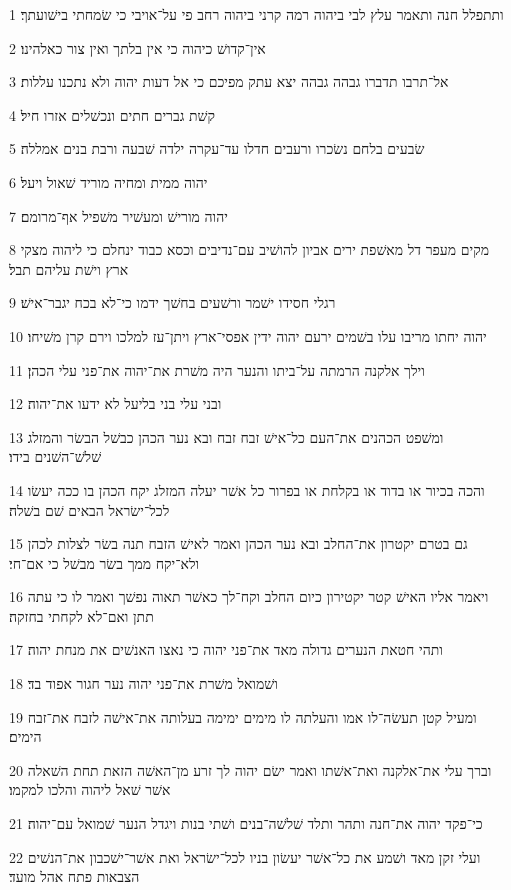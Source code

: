 \par 1 ותתפלל חנה ותאמר עלץ לבי ביהוה רמה קרני ביהוה רחב פי על־אויבי כי שׂמחתי בישׁועתך׃
\par 2 אין־קדושׁ כיהוה כי אין בלתך ואין צור כאלהינו׃
\par 3 אל־תרבו תדברו גבהה גבהה יצא עתק מפיכם כי אל דעות יהוה ולא נתכנו עללות׃
\par 4 קשׁת גברים חתים ונכשׁלים אזרו חיל׃
\par 5 שׂבעים בלחם נשׂכרו ורעבים חדלו עד־עקרה ילדה שׁבעה ורבת בנים אמללה׃
\par 6 יהוה ממית ומחיה מוריד שׁאול ויעל׃
\par 7 יהוה מורישׁ ומעשׁיר משׁפיל אף־מרומם׃
\par 8 מקים מעפר דל מאשׁפת ירים אביון להושׁיב עם־נדיבים וכסא כבוד ינחלם כי ליהוה מצקי ארץ וישׁת עליהם תבל׃
\par 9 רגלי חסידו ישׁמר ורשׁעים בחשׁך ידמו כי־לא בכח יגבר־אישׁ׃
\par 10 יהוה יחתו מריבו עלו בשׁמים ירעם יהוה ידין אפסי־ארץ ויתן־עז למלכו וירם קרן משׁיחו׃
\par 11 וילך אלקנה הרמתה על־ביתו והנער היה משׁרת את־יהוה את־פני עלי הכהן׃
\par 12 ובני עלי בני בליעל לא ידעו את־יהוה׃
\par 13 ומשׁפט הכהנים את־העם כל־אישׁ זבח זבח ובא נער הכהן כבשׁל הבשׂר והמזלג שׁלשׁ־השׁנים בידו׃
\par 14 והכה בכיור או בדוד או בקלחת או בפרור כל אשׁר יעלה המזלג יקח הכהן בו ככה יעשׂו לכל־ישׂראל הבאים שׁם בשׁלה׃
\par 15 גם בטרם יקטרון את־החלב ובא נער הכהן ואמר לאישׁ הזבח תנה בשׂר לצלות לכהן ולא־יקח ממך בשׂר מבשׁל כי אם־חי׃
\par 16 ויאמר אליו האישׁ קטר יקטירון כיום החלב וקח־לך כאשׁר תאוה נפשׁך ואמר לו כי עתה תתן ואם־לא לקחתי בחזקה׃
\par 17 ותהי חטאת הנערים גדולה מאד את־פני יהוה כי נאצו האנשׁים את מנחת יהוה׃
\par 18 ושׁמואל משׁרת את־פני יהוה נער חגור אפוד בד׃
\par 19 ומעיל קטן תעשׂה־לו אמו והעלתה לו מימים ימימה בעלותה את־אישׁה לזבח את־זבח הימים׃
\par 20 וברך עלי את־אלקנה ואת־אשׁתו ואמר ישׂם יהוה לך זרע מן־האשׁה הזאת תחת השׁאלה אשׁר שׁאל ליהוה והלכו למקמו׃
\par 21 כי־פקד יהוה את־חנה ותהר ותלד שׁלשׁה־בנים ושׁתי בנות ויגדל הנער שׁמואל עם־יהוה׃
\par 22 ועלי זקן מאד ושׁמע את כל־אשׁר יעשׂון בניו לכל־ישׂראל ואת אשׁר־ישׁכבון את־הנשׁים הצבאות פתח אהל מועד׃

